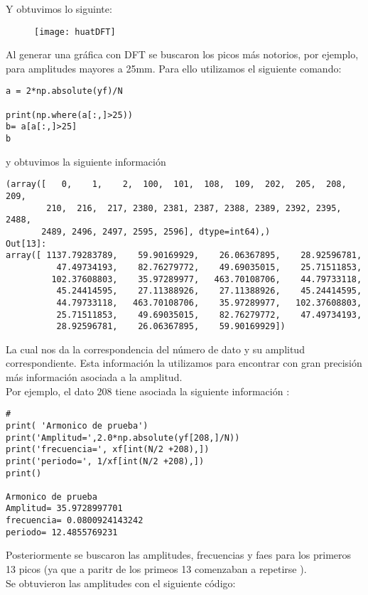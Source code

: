\documentclass[12pt]{article}
\begin{document}
\newpage 
Y obtuvimos lo siguinte:

\begin{figure}[ht]
\texttt{[image: huatDFT]}
\centering
\end{figure}


Al generar una gráfica con DFT se buscaron los picos más notorios, por ejemplo, para amplitudes mayores a 25mm. Para ello utilizamos el siguiente comando:

\begin{verbatim}
a = 2*np.absolute(yf)/N

print(np.where(a[:,]>25)) 
b= a[a[:,]>25]
b
\end{verbatim}

y  obtuvimos la siguiente información


\begin{verbatim}
(array([   0,    1,    2,  100,  101,  108,  109,  202,  205,  208,  209,
        210,  216,  217, 2380, 2381, 2387, 2388, 2389, 2392, 2395, 2488,
       2489, 2496, 2497, 2595, 2596], dtype=int64),)
Out[13]:
array([ 1137.79283789,    59.90169929,    26.06367895,    28.92596781,
          47.49734193,    82.76279772,    49.69035015,    25.71511853,
         102.37608803,    35.97289977,   463.70108706,    44.79733118,
          45.24414595,    27.11388926,    27.11388926,    45.24414595,
          44.79733118,   463.70108706,    35.97289977,   102.37608803,
          25.71511853,    49.69035015,    82.76279772,    47.49734193,
          28.92596781,    26.06367895,    59.90169929])
\end{verbatim}

La cual nos da la correspondencia del número de dato y su amplitud correspondiente. Esta información la utilizamos para encontrar con gran precisión más información asociada a la amplitud. \\
Por ejemplo, el dato 208 tiene asociada la siguiente información  : 

\begin{verbatim}
#
print( 'Armonico de prueba')
print('Amplitud=',2.0*np.absolute(yf[208,]/N))
print('frecuencia=', xf[int(N/2 +208),])
print('periodo=', 1/xf[int(N/2 +208),])
print()

Armonico de prueba
Amplitud= 35.9728997701
frecuencia= 0.0800924143242
periodo= 12.4855769231
\end{verbatim}

Posteriormente se buscaron las amplitudes, frecuencias y faes para los primeros 13 picos (ya que a paritr de los primeos 13 comenzaban a repetirse ).\\
Se obtuvieron las amplitudes con el siguiente código:
\end{document}
